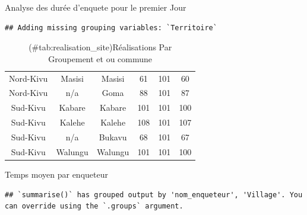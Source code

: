 \documentclass[
]{book}
\begin{document}
Analyse des durée d'enquete pour le premier Jour

\begin{verbatim}
## Adding missing grouping variables: `Territoire`
\end{verbatim}

\begin{table}

\caption{(\#tab:realisation_site)Réalisations Par Groupement et ou commune }
\centering
\begin{tabular}[t]{c|c|c|c|c|c}
\hline
\cellcolor{blue}{Province} & \cellcolor{blue}{Territoire} & \cellcolor{blue}{Territoire\_Commune} & \cellcolor{blue}{n} & \cellcolor{blue}{assignation} & \cellcolor{blue}{Pourcentage}\\
\hline
Nord-Kivu & Masisi & Masisi & 61 & 101 & 60\\
\hline
Nord-Kivu & n/a & Goma & 88 & 101 & 87\\
\hline
Sud-Kivu & Kabare & Kabare & 101 & 101 & 100\\
\hline
Sud-Kivu & Kalehe & Kalehe & 108 & 101 & 107\\
\hline
Sud-Kivu & n/a & Bukavu & 68 & 101 & 67\\
\hline
Sud-Kivu & Walungu & Walungu & 101 & 101 & 100\\
\hline
\end{tabular}
\end{table}

Temps moyen par enqueteur

\begin{verbatim}
## `summarise()` has grouped output by 'nom_enqueteur', 'Village'. You can override using the `.groups` argument.
\end{verbatim}
\end{document}
